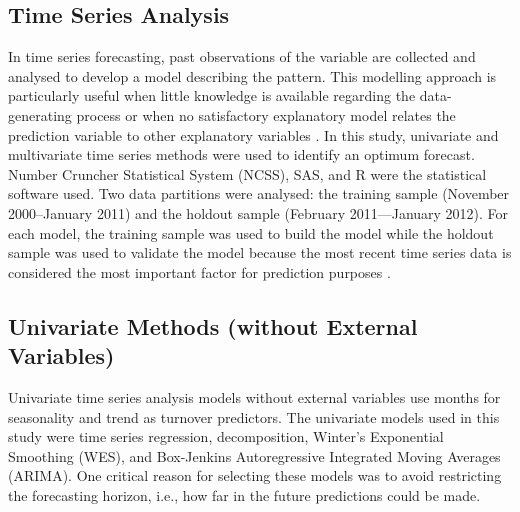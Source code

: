 \subsection{Time Series Analysis}
In time series forecasting, past observations of the variable are collected and analysed to develop a model describing the pattern. This modelling approach is particularly useful when little knowledge is available regarding  the data-generating process or when no satisfactory explanatory model relates the prediction variable to other explanatory variables \citep{zhang2003}. In this study, univariate and multivariate time series methods were used to identify an optimum forecast. Number Cruncher Statistical System (NCSS), SAS, and R were the statistical software used. Two data partitions were analysed: the training sample (November 2000–January 2011) and the holdout sample (February 2011—January 2012). For each model, the training sample was used to build the model while the holdout sample was used to validate the model because the most recent time series data is considered the most important factor for prediction purposes \citep{bergmeir2012}. 
\subsection{Univariate Methods (without External Variables)}
Univariate time series analysis models without external variables use months for seasonality and trend as turnover predictors. The univariate models used in this study were time series regression, decomposition, Winter's Exponential Smoothing (WES), and Box-Jenkins Autoregressive Integrated Moving Averages (ARIMA). One critical reason for selecting these models was to avoid restricting the forecasting horizon, i.e., how far in the future predictions could be made. 

